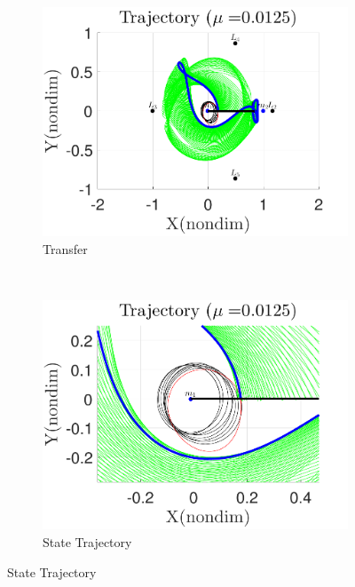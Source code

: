 \documentclass[preprint]{elsarticle}
\begin{document}
\begin{figure} 
	\centering 
	\begin{subfigure}[htbp]{0.5\textwidth} 
		\includegraphics[width=\textwidth]{geo_transfer_full} 
		\caption{Transfer} \label{fig:geo_transfer_full} 
	\end{subfigure}~ %
	\begin{subfigure}[htbp]{0.5\textwidth} 
		\includegraphics[width=\textwidth]{geo_transfer_zoom} 
		\caption{State Trajectory} \label{fig:geo_transfer_zoom} 
	\end{subfigure} 
	

\end{figure}
\end{document}
